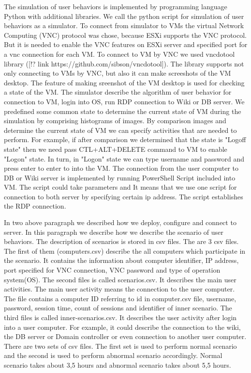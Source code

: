 The simulation of user behaviors is implemented by programming language Python with additional libraries. We call the python script for simulation of user behaviors as a simulator. To connect from simulator to VMs the virtual Network Computing (VNC) protocol was chose, because ESXi supports the VNC protocol. But it is needed to enable the VNC features on ESXi server and specified port for a vnc connection for each VM. To connect to VM by VNC we used vncdotool library ([!? link  https://github.com/sibson/vncdotool]). The library supports not only connecting to VMs by VNC, but also it can make screeshots of the VM desktop. The feature of making sreenshot of the VM desktop is used for checking a state of the VM.  The simulator describe the algorithm of user behavior for connection to VM, login into OS, run RDP connection to Wiki or DB server. We predefined some common state to determine the current state of VM during the simulation by comprising histograms of images. By comparison images and determine the current state of VM we can specify activities that are needed to perform. For example, if after comparison we determined that the state is "Logoff state" then we need pass CTL+ALT+DELETE command to VM to enable "Logon" state. In turn, in "Logon" state we can type username and password and press enter to enter to into the VM. The connection from the user computer to DB or Wiki server is implemented by running PowerShell Script included into VM. The script could take parameters and It means that we use one script for connection to both server by specifying certain ip address. The script establishes the RDP connection. 

In two above paragraph we described how we deploy, configure and connect to server. In this paragraph we describe how we describe the scenario of user behaviors. The description of scenarios is stored in csv files. The are 3 csv files. The first of them (computers.csv) describe the all computers which participate in the scenario. It contains the information about computer identifier, IP address, port specified for VNC connection, VNC password and type of operation system(OS).
The second files is called scenarios.csv. It describes the main user activities. The main user activity means the connection to the user computer. The file contains a computer ID referring to id in computer.csv file, username, password, session time, count of sessions and identifier of inner scenario. The third files is called inner-scenarios.csv. It describes the user activity after login into a user computer. For example, it could describe the connection to the wiki, the DB server or Domain controller or even connection to another user computer. There are two sets of csv files. The first set is used to perform normal scenario and the second is used to perform abnormal scenario 	
accordingly. Normal scenario takes about 3,5 hours and abnormal scenario takes about 5,5 hours.
 
% 